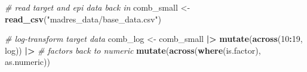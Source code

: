 \documentclass[12pt, twoside]{amherstthesis}
\newenvironment{Shaded}{\begin{snugshade}}{\end{snugshade}}
\newcommand{\CommentTok}[1]{\textcolor[rgb]{0.56,0.35,0.01}{\textit{#1}}}
\newcommand{\DecValTok}[1]{\textcolor[rgb]{0.00,0.00,0.81}{#1}}
\newcommand{\FunctionTok}[1]{\textcolor[rgb]{0.13,0.29,0.53}{\textbf{#1}}}
\newcommand{\NormalTok}[1]{#1}
\newcommand{\OtherTok}[1]{\textcolor[rgb]{0.56,0.35,0.01}{#1}}
\newcommand{\SpecialCharTok}[1]{\textcolor[rgb]{0.81,0.36,0.00}{\textbf{#1}}}
\newcommand{\StringTok}[1]{\textcolor[rgb]{0.31,0.60,0.02}{#1}}
\begin{document}
\scriptsize
\begin{Shaded}
\begin{Highlighting}[]
\CommentTok{\# read target and epi data back in}
\NormalTok{comb\_small }\OtherTok{\textless{}{-}} \FunctionTok{read\_csv}\NormalTok{(}\StringTok{"madres\_data/base\_data.csv"}\NormalTok{)}

\CommentTok{\# log{-}transform target data}
\NormalTok{comb\_log }\OtherTok{\textless{}{-}}\NormalTok{ comb\_small }\SpecialCharTok{|\textgreater{}} 
  \FunctionTok{mutate}\NormalTok{(}\FunctionTok{across}\NormalTok{(}\DecValTok{10}\SpecialCharTok{:}\DecValTok{19}\NormalTok{, log)) }\SpecialCharTok{|\textgreater{}} 
  \CommentTok{\# factors back to numeric}
  \FunctionTok{mutate}\NormalTok{(}\FunctionTok{across}\NormalTok{(}\FunctionTok{where}\NormalTok{(is.factor), as.numeric))}


\end{Highlighting}
\end{Shaded}
\end{document}
